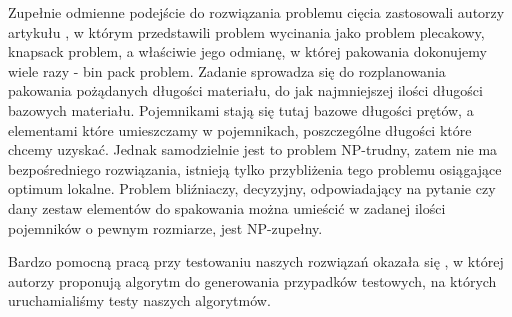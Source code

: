 Zupełnie odmienne podejście do rozwiązania problemu cięcia zastosowali autorzy artykułu \cite{bin-packing}, w którym przedstawili problem wycinania jako problem plecakowy, knapsack problem, a właściwie jego odmianę, w której pakowania dokonujemy wiele razy - bin pack problem. Zadanie sprowadza się do rozplanowania pakowania pożądanych długości materiału, do jak najmniejszej ilości długości bazowych materiału. Pojemnikami stają się tutaj bazowe długości prętów, a elementami które umieszczamy w pojemnikach, poszczególne długości które chcemy uzyskać. Jednak samodzielnie jest to problem NP-trudny, zatem nie ma bezpośredniego rozwiązania, istnieją tylko przybliżenia tego problemu osiągające optimum lokalne. Problem bliźniaczy, decyzyjny, odpowiadający na pytanie czy dany zestaw elementów do spakowania można umieścić w zadanej ilości pojemników o pewnym rozmiarze, jest NP-zupełny.

Bardzo pomocną pracą przy testowaniu naszych rozwiązań okazała się \cite{problem-generator}, w której autorzy proponują algorytm  do generowania przypadków testowych, na których uruchamialiśmy testy naszych algorytmów.
